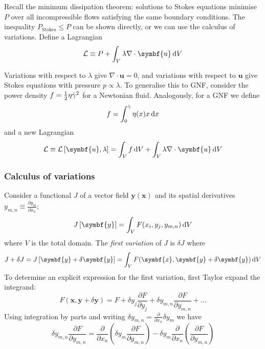 \documentclass{jknotes}
\begin{document}
Recall the minimum dissipation theorem: solutions to Stokes equations minimise
$P$ over all incompressible flows satisfying the same boundary conditions. The
inequality $P_{\text{Stokes}} \le P$ can be shown directly, or we can use the
calculus of variations. Define a Lagrangian
\begin{equation}
	\mathcal{L} \equiv P + \int_V \lambda \nabla \cdot \symbf{u} \, \diffd V
\end{equation}

Variations with respect to $\lambda$ give $\nabla \cdot \symbf{u} = 0$, and
variations with respect to $\symbf{u}$ give Stokes equations with pressure $p
\propto \lambda$. To generalise this to GNF, consider the power density $f =
\frac{1}{2}\eta \dot{\gamma}^2$ for a Newtonian fluid. Analogously, for a GNF we define
\begin{equation}
	f = \int_0^{\srate} \eta(x)x\, \diffd x
\end{equation}
and a new Lagrangian
\begin{equation}
	\mathcal{L} \equiv \mathcal{L}\left[\symbf{u},\lambda\right] = \int_V f \, \diffd
	V + \int_V \lambda \nabla \cdot \symbf{u}\,\diffd V
\end{equation}

\subsubsection{Calculus of variations}
Consider a functional $J$ of a vector field $\symbf{y}(\symbf{x})$ and its
spatial derivatives $y_{m,n} \equiv \frac{\partial y_m}{\partial x_n}$;
\begin{equation}
	J\left[\symbf{y}\right] = \int_V F(x_i,y_j,y_{m,n}) \, \diffd V
\end{equation}
where $V$ is the total domain. The \emph{first variation} of $J$ is $\delta J$ where
\begin{equation}
	J + \delta J = J\left[\symbf{y}+\delta\symbf{y}\right] = \int_V
	F(\symbf{x},\symbf{y}+\delta\symbf{y})\,\diffd V
\end{equation}
To determine an explicit expression for the first variation, first Taylor
expand the integrand:
\begin{equation}
	F(\symbf{x},\symbf{y}+\delta\symbf{y}) = F + \delta y_j \frac{\partial F}{\partial
		y_j} + \delta y_{m,n} \frac{\partial F}{\partial y_{m,n}} + \dots
\end{equation}
Using integration by parts and writing $\delta y_{m,n} =
\frac{\partial}{\partial x_n} \delta y_m$ we have
\begin{equation}
	\delta y_{m,n} \frac{\partial F}{\partial y_{m,n}} = 
	\frac{\partial}{\partial x_n}\left( \delta y_m \frac{\partial F}{\partial
		y_{m,n}}\right) - \delta y_m \frac{\partial}{\partial x_n} \left(
	\frac{\partial F}{\partial y_{m,n}}\right)
\end{equation}
\end{document}
